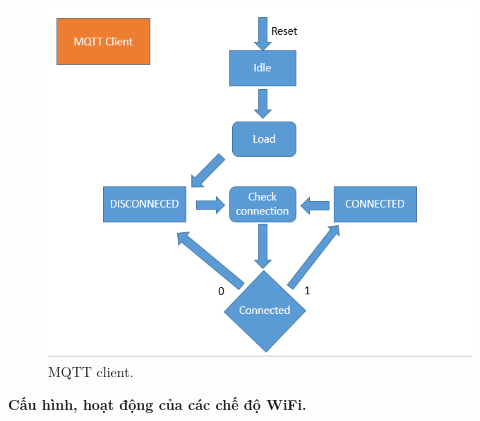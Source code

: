 \documentclass[a4paper,12pt,oneside]{article}
\begin{document}
\begin{itemize}
			\begin{center}
			\begin{figure}[h!]
			\begin{center}
			\includegraphics[scale=.6]{hinh/mqtt_client.PNG}
			\end{center}
			\caption{MQTT client.}
			\end{figure}
			\end{center}
	\end{itemize}
\noindent	\textbf{Cấu hình, hoạt động của các chế độ WiFi.}
\end{document}
